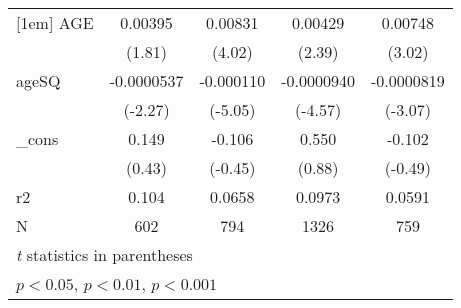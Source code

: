 \begin{table}[htbp]
\begin{tabular}{l*{4}{c}}
[1em]
AGE         &     0.00395         &     0.00831\sym{***}&     0.00429\sym{*}  &     0.00748\sym{**} \\
            &      (1.81)         &      (4.02)         &      (2.39)         &      (3.02)         \\
[1em]
ageSQ       &  -0.0000537\sym{*}  &   -0.000110\sym{***}&  -0.0000940\sym{***}&  -0.0000819\sym{**} \\
            &     (-2.27)         &     (-5.05)         &     (-4.57)         &     (-3.07)         \\
[1em]
\_cons      &       0.149         &      -0.106         &       0.550         &      -0.102         \\
            &      (0.43)         &     (-0.45)         &      (0.88)         &     (-0.49)         \\
\hline
r2          &       0.104         &      0.0658         &      0.0973         &      0.0591         \\
N           &         602         &         794         &        1326         &         759         \\
\hline\hline
\multicolumn{5}{l}{\footnotesize \textit{t} statistics in parentheses}\\
\multicolumn{5}{l}{\footnotesize \sym{*} \(p<0.05\), \sym{**} \(p<0.01\), \sym{***} \(p<0.001\)}\\
\end{tabular}
\end{table}
